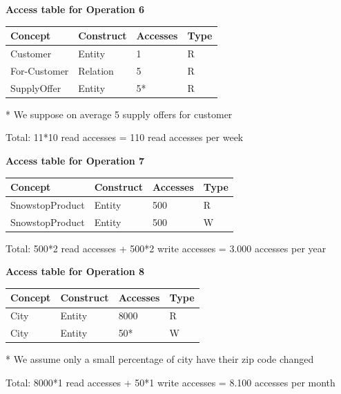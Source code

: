 \documentclass{article}[h]
\begin{document}
{{\centering \textbf{Access table for Operation 6}\\}
\begin{table}[H]
  \def\arraystretch{1.10}%
  \centering
  \begin{tabular}{ | m{4cm} | m{4cm}| m{3cm} | m{2cm} |} 
    \hline
    {\textbf{\large Concept}} & {\textbf{\large Construct}} & {\textbf{\large Accesses}} & {\textbf{\large Type}} \\
    \hline
    \color[HTML]{3531FF} Customer & Entity & 1 & R \\ 
    \hline
    \color[HTML]{3531FF} For-Customer & Relation & 5 & R \\ 
    \hline
    \color[HTML]{3531FF} SupplyOffer & Entity & 5* & R \\ 
    \hline
  \end{tabular}
  \small{* We suppose on average 5 supply offers for customer}
\end{table}
Total: 11*10 read accesses = 110 read accesses per week

\vspace{12px}

{\centering \textbf{Access table for Operation 7}\\}
\begin{table}[H]
  \def\arraystretch{1.10}%
  \centering
  \begin{tabular}{ | m{4cm} | m{4cm}| m{3cm} | m{2cm} |} 
    \hline
    {\textbf{\large Concept}} & {\textbf{\large Construct}} & {\textbf{\large Accesses}} & {\textbf{\large Type}} \\
    \hline
    \color[HTML]{3531FF} SnowstopProduct & Entity & 500 & R \\ 
    \hline
    \color[HTML]{3531FF} SnowstopProduct & Entity & 500 & W \\ 
    \hline
  \end{tabular}
\end{table}
Total: 500*2 read accesses + 500*2 write accesses = 3.000 accesses per year

\vspace{12px}

{\centering \textbf{Access table for Operation 8}\\}
\begin{table}[H]
  \def\arraystretch{1.10}%
  \centering
  \begin{tabular}{ | m{4cm} | m{4cm}| m{3cm} | m{2cm} |} 
    \hline
    {\textbf{\large Concept}} & {\textbf{\large Construct}} & {\textbf{\large Accesses}} & {\textbf{\large Type}} \\
    \hline
    \color[HTML]{3531FF} City & Entity & 8000 & R \\ 
    \hline
    \color[HTML]{3531FF} City & Entity & 50* & W \\ 
    \hline
  \end{tabular}
  \small{* We assume only a small percentage of city have their zip code changed}
\end{table}
Total: 8000*1 read accesses + 50*1 write accesses = 8.100 accesses per month

}
\end{document}

